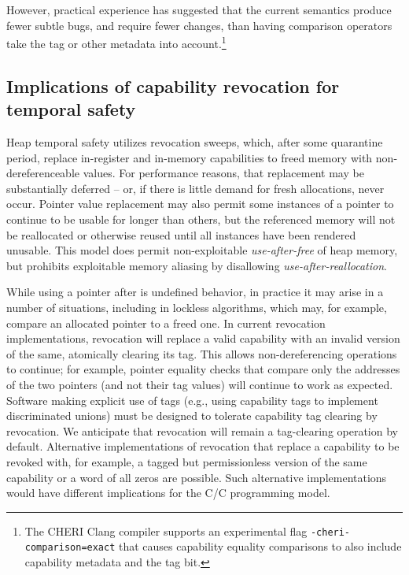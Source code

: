 \documentclass[12pt,twoside,openright,usletter]{article}
\newcommand{\ccode}[1]{{\small\ttfamily{#1}}}
\newcommand{\cfunc}[1]{{\ccode{#1()}}}
\newcommand{\note}[2]{{\color{blue}[ Note: #1 - #2]}}
\renewcommand{\note}[2]{\relax\ifhmode\unskip\fi}
\newcommand{\arnote}[1]{\note{#1}{Alex R.}}
\newcommand{\psnote}[1]{\note{#1}{Peter S.}}
\newcommand*{\cpp}[1][]{C\textsmaller[2]{\nolinebreak[4]\hspace{-.05em}\raisebox{.45ex}{\textbf{++}}}}
\begin{document}
\psnote{I'm curious about the impact on compiler optimisation, where in the scope of \texttt{if (p==q)} compilers will often assume the two are interchangeable.  Comment on that?
 }
 \arnote{The choice between exact vs non-exact equals is made extremely late in code generation, it just chooses between emitting CEq and CExEq.
 Compiler analyses use a stricter definition of equality.
 In clang that should include some cases of taking provenance into account for alias information.}

\noindent
However, practical experience has suggested that the current semantics produce fewer
subtle bugs, and require fewer changes, than having comparison operators take
the tag or other metadata into account.\footnote{
The CHERI Clang compiler supports an experimental flag \texttt{-cheri-comparison=exact} that causes capability equality comparisons to also include capability metadata and the tag bit.
\arnote{default behaviour=\texttt{-cheri-comparison=address}}
}

\subsection{Implications of capability revocation for temporal safety}

Heap temporal safety utilizes revocation sweeps, which, after some quarantine
period, replace in-register and in-memory capabilities to freed memory with
non-dereferenceable values.
For performance reasons, that replacement may be substantially deferred -- or,
if there is little demand for fresh allocations, never occur.
Pointer value replacement may also permit some instances of
a pointer to continue to be usable for longer than others, but the referenced
memory will not be reallocated or otherwise reused until all instances have been rendered unusable.
This model does permit non-exploitable \textit{use-after-free} of heap memory,
but prohibits exploitable memory aliasing by disallowing \textit{use-after-reallocation}.

While using a pointer after \cfunc{free} is undefined behavior, in practice it
may arise in a number of situations, including in lockless algorithms, which
may, for example, compare an allocated pointer to a freed one.
In current revocation implementations, revocation will replace a valid
capability with an invalid version of the same, atomically clearing its tag.
This allows non-dereferencing operations to continue; for example, pointer
equality checks that compare only the addresses of the two pointers (and not
their tag values) will continue to work as expected.
Software making explicit use of tags (e.g., using capability tags to implement
discriminated unions) must be designed to tolerate capability tag clearing by
revocation. We anticipate that revocation will remain a tag-clearing operation
by default. Alternative implementations of revocation that replace a capability
to be revoked with, for example, a tagged but permissionless version of the same
capability or a word of all zeros are possible. Such alternative implementations
would have different implications for the C/\cpp{} programming model.
\end{document}

